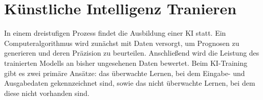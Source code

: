 \section{Künstliche Intelligenz Tranieren}

In einem dreistufigen Prozess findet die Ausbildung einer KI statt.
Ein Computeralgorithmus wird zunächst mit Daten versorgt, um Prognosen zu generieren und deren Präzision zu beurteilen.
Anschließend wird die Leistung des trainierten Modells an bisher ungesehenen Daten bewertet.
Beim KI-Training gibt es zwei primäre Ansätze: das überwachte Lernen, bei dem Eingabe- und Ausgabedaten gekennzeichnet sind, sowie das nicht überwachte Lernen, bei dem diese nicht vorhanden sind. \citep{ai-training-cw}